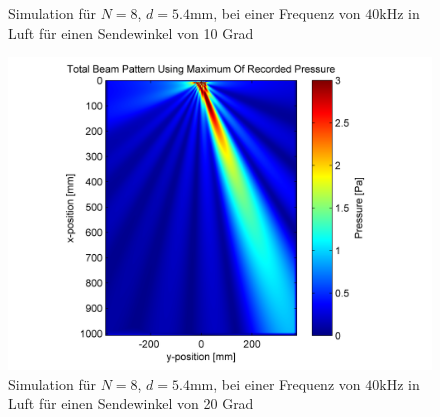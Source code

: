\begin{figure}[hb]
\begin{minipage}{0.5\textwidth}
\begin{center}
\end{center}
\caption{Simulation für $N = 8$, $d = 5.4 \mathrm{mm}$, bei einer Frequenz von $40 \mathrm{kHz}$ in Luft für einen Sendewinkel von 10 Grad} %
\label{fig:image_grundlagen_sim_10_degrees}
%
\end{minipage}
\begin{minipage}{0.5\textwidth}
\begin{center}
\includegraphics[width=1.2\textwidth]{graphics/image_grundlagen_sim_20_degrees.png}
\end{center}
\caption{Simulation für $N = 8$, $d = 5.4 \mathrm{mm}$, bei einer Frequenz von $40 \mathrm{kHz}$ in Luft für einen Sendewinkel von 20 Grad} %
\label{fig:image_grundlagen_sim_20_degrees}
%
\end{minipage}
\end{figure}


\clearpage
